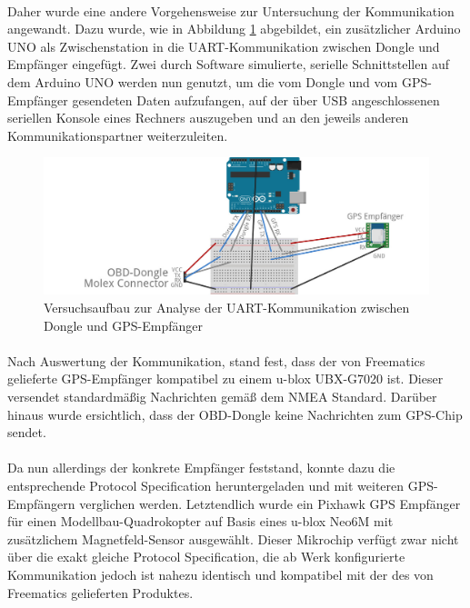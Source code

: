 \paragraph{}
Daher wurde eine andere Vorgehensweise zur Untersuchung der Kommunikation angewandt. Dazu wurde, wie in Abbildung \ref{fig:gpsAnalyse} abgebildet, ein zusätzlicher Arduino UNO als Zwischenstation in die UART-Kommunikation zwischen Dongle und Empfänger eingefügt. Zwei durch Software simulierte, serielle Schnittstellen auf dem Arduino UNO werden nun genutzt, um die vom Dongle und vom GPS-Empfänger gesendeten Daten aufzufangen, auf der über USB angeschlossenen seriellen Konsole eines Rechners auszugeben und an den jeweils anderen Kommunikationspartner weiterzuleiten.
\begin{figure}
  \begin{center}
    \includegraphics[width=\textwidth]{./img/gpsVersuch}
    \caption{Versuchsaufbau zur Analyse der UART-Kommunikation zwischen Dongle und GPS-Empfänger}
    \label{fig:gpsAnalyse}
  \end{center}
\end{figure}
\paragraph{}
Nach Auswertung der Kommunikation, stand fest, dass der von Freematics gelieferte GPS-Empfänger kompatibel zu einem u-blox UBX-G7020 ist. Dieser versendet standardmäßig Nachrichten gemäß dem \ac{NMEA} Standard. Darüber hinaus wurde ersichtlich, dass der OBD-Dongle keine Nachrichten zum GPS-Chip sendet.
\paragraph{}
Da nun allerdings der konkrete Empfänger feststand, konnte dazu die entsprechende Protocol Specification heruntergeladen und mit weiteren GPS-Empfängern verglichen werden.
Letztendlich wurde ein Pixhawk GPS Empfänger für einen Modellbau-Quadrokopter auf Basis eines u-blox Neo6M mit zusätzlichem Magnetfeld-Sensor ausgewählt. Dieser Mikrochip verfügt zwar nicht über die exakt gleiche Protocol Specification, die ab Werk konfigurierte Kommunikation jedoch ist nahezu identisch und kompatibel mit der des von Freematics gelieferten Produktes.

